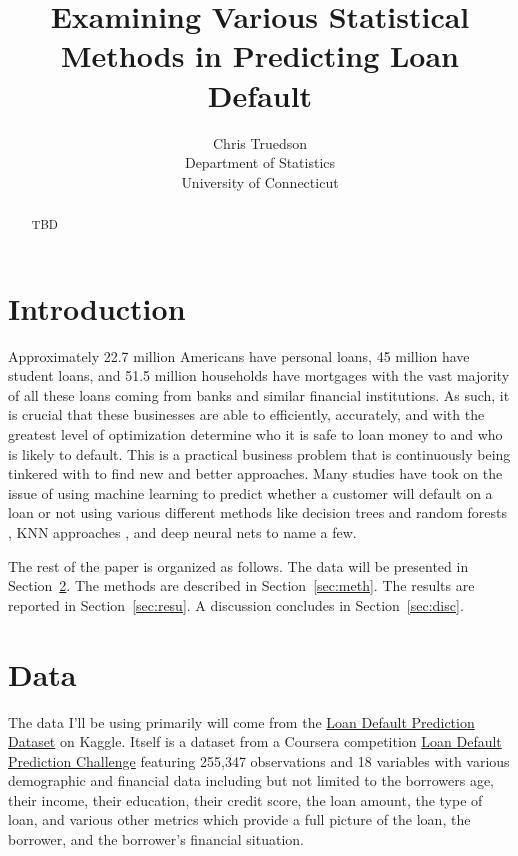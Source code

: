 \documentclass[12pt]{article}
\title{Examining Various Statistical Methods in Predicting Loan Default}
\author{Chris Truedson\\
  Department of Statistics\\
  University of Connecticut
}
\begin{document}
\maketitle

\begin{abstract}
TBD  
\end{abstract}


\section{Introduction}
\label{sec:intro}

Approximately 22.7 million Americans have personal loans, 45 million have student loans, and 51.5 million households have mortgages with the vast majority of all these loans coming from banks and similar financial institutions. As such, it is crucial that these businesses are able to efficiently, accurately, and with the greatest level of optimization determine who it is safe to loan money to and who is likely to default. This is a practical business problem that is continuously being tinkered with to find new and better approaches. Many studies have took on the issue of using machine learning to predict whether a customer will default on a loan or not using various different methods like decision trees and random forests \citet{madaan2021loan}, KNN approaches \citet{lai2020loan}, and deep neural nets \citet{bayraci2019deep} to name a few.

The rest of the paper is organized as follows.
The data will be presented in Section~\ref{sec:data}.
The methods are described in Section~\ref{sec:meth}.
The results are reported in Section~\ref{sec:resu}.
A discussion concludes in Section~\ref{sec:disc}.


\section{Data}
\label{sec:data}

The data I'll be using primarily will come from the \href{https://www.kaggle.com/datasets/nikhil1e9/loan-default}{Loan Default Prediction Dataset} on Kaggle. Itself is a dataset from a Coursera competition \href{https://www.coursera.org/projects/data-science-coding-challenge-loan-default-prediction}{Loan Default Prediction Challenge} featuring 255,347 observations and 18 variables with various demographic and financial data including but not limited to the borrowers age, their income, their education, their credit score, the loan amount, the type of loan, and various other metrics which provide a full picture of the loan, the borrower, and the borrower's financial situation.
\end{document}
